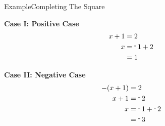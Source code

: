 \documentclass[aspectratio=169, sectionpages]{beamer}
\begin{document}
\begin{frame}{Example}{Completing The Square}
	\hfill\\
	\begin{minipage}[t]{0.45\textwidth}
		\vspace{0pt}
		\textbf{Case I: Positive Case}
		\begin{align*}
			x + 1 & = 2           \\
			x     & = \oneg 1 + 2 \\
			      & = 1
		\end{align*}
	\end{minipage}
	\hspace{0.05\textwidth}
	\begin{minipage}[t]{0.45\textwidth}
		\vspace{0pt}
		\textbf{Case II: Negative Case}
		\begin{align*}
			-(x + 1) & = 2                 \\
			x + 1    & = \oneg 2           \\
			x        & = \oneg 1 + \oneg 2 \\
			         & = \oneg 3
		\end{align*}

	\end{minipage}
	\hfill
\end{frame}
\end{document}

